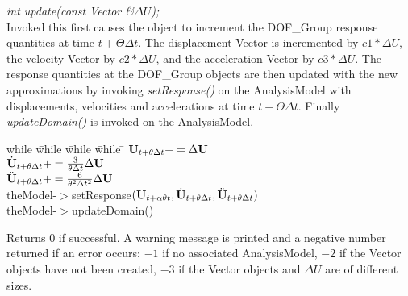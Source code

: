 {\em int update(const Vector \&$\Delta U$);} \\
Invoked this first causes the object to increment the DOF\_Group
response quantities at time $t + \Theta \Delta t$. The displacement Vector is  
incremented by $ c1 * \Delta U$, the velocity Vector by $
c2 * \Delta U$, and the acceleration Vector by $c3 * \Delta U$. 
The response quantities at the DOF\_Group objects are then updated
with the new approximations by invoking {\em setResponse()} on the
AnalysisModel with displacements, velocities and accelerations at time
$t + \Theta \Delta t$.
Finally {\em updateDomain()} is invoked on the AnalysisModel. 
\begin{tabbing}
while \= while \= while \= while \= \kill
\>\> $ {\bf U}_{t + \theta \Delta t} += \Delta {\bf U}$ \\
\>\> $ \dot {{\bf U}}_{t + \theta \Delta t} += \frac{3}{\theta \Delta t}
\Delta {\bf U}  $\\
\>\> $ \ddot {{\bf U}}_{t + \theta \Delta t} += \frac{6}{\theta^2 \Delta
t^2} \Delta {\bf U} $ \\ 
\>\> theModel-$>$setResponse$({\bf U}_{t + \alpha \theta t}, \dot{\bf U}_{t+\theta
\Delta t}, \ddot{\bf U}_{t+ \theta \Delta t})$ \\
\>\> theModel-$>$updateDomain()
\end{tabbing}
Returns $0$ if successful. A warning message is printed and a negative number
returned if an error occurs: $-1$ if no associated AnalysisModel, $-2$
if the Vector objects have not been created, $-3$ if the Vector
objects and $\Delta U$ are of different sizes. \\



